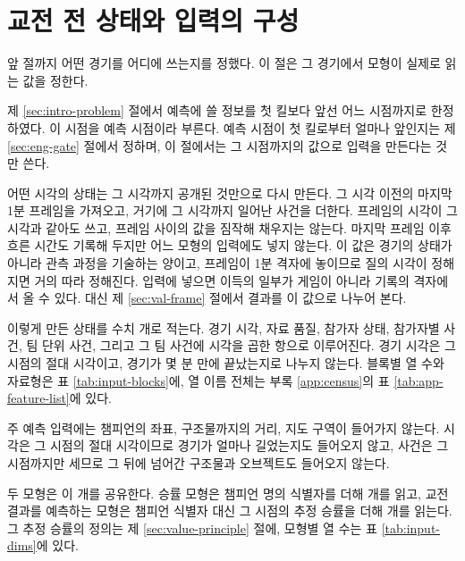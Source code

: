 \section{교전 전 상태와 입력의 구성}
\label{sec:data-inputs}

앞 절까지 어떤 경기를 어디에 쓰는지를 정했다. 이 절은 그 경기에서 모형이 실제로 읽는 값을 정한다.

제 \ref{sec:intro-problem} 절에서 예측에 쓸 정보를 첫 킬보다 앞선 어느 시점까지로 한정하였다. 이 시점을 예측 시점이라 부른다. 예측 시점이 첫 킬로부터 얼마나 앞인지는 제 \ref{sec:eng-gate} 절에서 정하며, 이 절에서는 그 시점까지의 값으로 입력을 만든다는 것만 쓴다.

어떤 시각의 상태는 그 시각까지 공개된 것만으로 다시 만든다. 그 시각 이전의 마지막 1분 프레임을 가져오고, 거기에 그 시각까지 일어난 사건을 더한다. 프레임의 시각이 그 시각과 같아도 쓰고, 프레임 사이의 값을 짐작해 채우지는 않는다. 마지막 프레임 이후 흐른 시간도 기록해 두지만 어느 모형의 입력에도 넣지 않는다. 이 값은 경기의 상태가 아니라 관측 과정을 기술하는 양이고, 프레임이 1분 격자에 놓이므로 질의 시각이 정해지면 거의 따라 정해진다. 입력에 넣으면 이득의 일부가 게임이 아니라 기록의 격자에서 올 수 있다. 대신 제 \ref{sec:val-frame} 절에서 결과를 이 값으로 나누어 본다.

이렇게 만든 상태를 수치 \dimNumeric{}개로 적는다. 경기 시각, 자료 품질, 참가자 상태, 참가자별 사건, 팀 단위 사건, 그리고 그 팀 사건에 시각을 곱한 항으로 이루어진다. 경기 시각은 그 시점의 절대 시각이고, 경기가 몇 분 만에 끝났는지로 나누지 않는다. 블록별 열 수와 자료형은 표 \ref{tab:input-blocks}에, 열 이름 전체는 부록 \ref{app:census}의 표 \ref{tab:app-feature-list}에 있다.



주 예측 입력에는 챔피언의 좌표, 구조물까지의 거리, 지도 구역이 들어가지 않는다. 시각은 그 시점의 절대 시각이므로 경기가 얼마나 길었는지도 들어오지 않고, 사건은 그 시점까지만 세므로 그 뒤에 넘어간 구조물과 오브젝트도 들어오지 않는다.

두 모형은 이 \dimNumeric{}개를 공유한다. 승률 모형은 챔피언 \dimChampSlots{}명의 식별자를 더해 \dimExpanded{}개를 읽고, 교전 결과를 예측하는 모형은 챔피언 식별자 대신 그 시점의 추정 승률을 더해 \dimInputQ{}개를 읽는다. 그 추정 승률의 정의는 제 \ref{sec:value-principle} 절에, 모형별 열 수는 표 \ref{tab:input-dims}에 있다.


